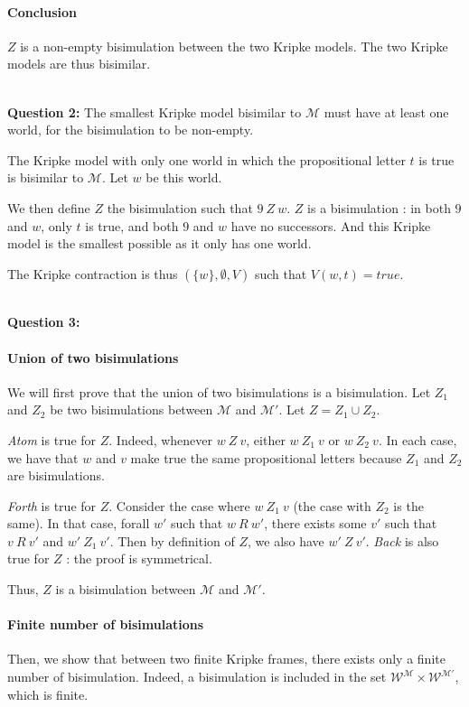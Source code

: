 \documentclass[10pt]{article}
\def\question#1{\ \vspace{1cm}\\\textbf{Question #1:}\quad}
\def\M{\mathcal{M}}
\begin{document}
\paragraph{Conclusion} $Z$ is a non-empty bisimulation between the two Kripke models. The two Kripke models are thus bisimilar.


\question{2} The smallest Kripke model bisimilar to $\M$ must have at least one world, for the bisimulation to be non-empty.

The Kripke model with only one world in which the propositional letter $t$ is true is bisimilar to $\M$. Let $w$ be this world.

We then define $Z$ the bisimulation such that $9\ Z\ w$. $Z$ is a bisimulation : in both $9$ and $w$, only $t$ is true, and both $9$ and $w$ have no successors. And this Kripke model is the smallest possible as it only has one world.

The Kripke contraction is thus $(\{w\},\emptyset,V)$ such that $V(w,t)=\mathit{true}$.


\question{3}

\paragraph{Union of two bisimulations} We will first prove that the union of two bisimulations is a bisimulation.
Let $Z_1$ and $Z_2$ be two bisimulations between $\M$ and $\M'$. Let $Z=Z_1\cup Z_2$.

\textit{Atom} is true for $Z$. Indeed, whenever $w\ Z\ v$, either $w\ Z_1\ v$ or $w\ Z_2\ v$. In each case, we have that $w$ and $v$ make true the same propositional letters because $Z_1$ and $Z_2$ are bisimulations.

\textit{Forth} is true for $Z$. Consider the case where $w\ Z_1\ v$ (the case with $Z_2$ is the same). In that case, forall $w'$ such that $w\ R\ w'$, there exists some $v'$ such that $v\ R\ v'$ and $w'\ Z_1\ v'$. Then by definition of $Z$, we also have $w'\ Z\ v'$.
\textit{Back} is also true for $Z$ : the proof is symmetrical.

Thus, $Z$ is a bisimulation between $\M$ and $\M'$.

\paragraph{Finite number of bisimulations} Then, we show that between two finite Kripke frames, there exists only a finite number of bisimulation. Indeed, a bisimulation is included in the set $\mathcal{W}^\M\times\mathcal{W}^{\M'}$, which is finite.
\end{document}

